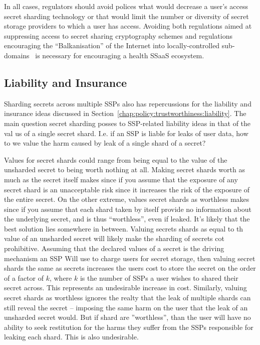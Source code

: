 In all cases, regulators should avoid polices what would decrease a
user's access secret sharding technology or that would limit the
number or diversity of secret storage providers to which a user has
access. Avoiding both regulations aimed at suppressing access to
secret sharing cryptography schemes and regulations encouraging the
``Balkanisation'' of the Internet into locally-controlled
sub-domains~\cite{lee2014} is necessary for encouraging a health SSaaS
ecosystem.

\subsection{Liability and Insurance}

Sharding secrets across multiple SSPs also has repercussions for the
liability and insurance ideas discussed in
Section~\ref{chap:policy:trustworthiness:liability}. The main question
secret sharding posses to SSP-related liability ideas in that of the
val us of a single secret shard. I.e. if an SSP is liable for leaks of
user data, how to we value the harm caused by leak of a single shard
of a secret?

Values for secret shards could range from being equal to the value of
the unsharded secret to being worth nothing at all. Making secret
shards worth as much as the secret itself makes since if you assume
that the exposure of any secret shard is an unacceptable risk since it
increases the risk of the exposure of the entire secret. On the other
extreme, values secret shards as worthless makes since if you assume
that each shard taken by itself provide no information about the
underlying secret, and is thus ``worthless'', even if leaked. It's
likely that the best solution lies somewhere in between. Valuing
secrets shards as equal to th value of an unsharded secret will likely
make the sharding of secrets cot prohibitive. Assuming that the
declared values of a secret is the driving mechanism an SSP Will use
to charge users for secret storage, then valuing secret shards the
same as secrets increases the users cost to store the secret on the
order of a factor of $k$, where $k$ is the number of SSPs a user
wishes to shared their secret across. This represents an undesirable
increase in cost. Similarly, valuing secret shards as worthless
ignores the realty that the leak of multiple shards can still reveal
the secret -- imposing the same harm on the user that the leak of an
unsharded secret would. But if shard are ''worthless'', than the user
will have no ability to seek restitution for the harms they suffer
from the SSPs responsible for leaking each shard. This is also
undesirable.

